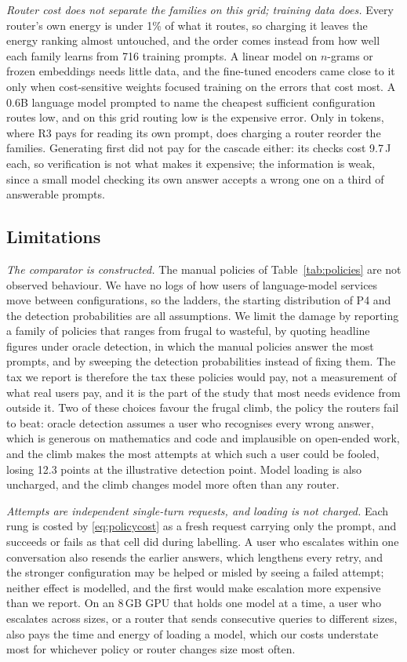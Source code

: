 \documentclass[final,5p,times,twocolumn]{elsarticle}
\theoremstyle{plain}
\begin{document}
\emph{Router cost does not separate the families on this grid; training data
does.} Every router's own energy is under 1\% of what it routes, so charging
it leaves the energy ranking almost untouched, and the order comes instead
from how well each family learns from 716 training prompts. A linear model on
$n$-grams or frozen embeddings needs little data, and the fine-tuned encoders
came close to it only when cost-sensitive weights focused training on the
errors that cost most. A 0.6B language model prompted to name the cheapest
sufficient configuration routes low, and on this grid routing low is the
expensive error. Only in tokens, where R3 pays for reading its own prompt,
does charging a router reorder the families. Generating first did not pay for
the cascade either: its checks cost 9.7\,J each, so verification is not what
makes it expensive; the information is weak, since a small model checking its
own answer accepts a wrong one on a third of answerable prompts.

\subsection{Limitations}
\label{sec:limitations}

\emph{The comparator is constructed.} The manual policies of
Table~\ref{tab:policies} are not observed behaviour. We have no logs of how
users of language-model services move between configurations, so the ladders,
the starting distribution of P4 and the detection probabilities are all
assumptions. We limit the damage by reporting a family of policies that
ranges from frugal to wasteful, by quoting headline figures under oracle
detection, in which the manual policies answer the most prompts, and by
sweeping the detection probabilities instead of fixing them. The tax we
report is therefore the tax these policies would pay, not a measurement of
what real users pay, and it is the part of the study that most needs evidence
from outside it. Two of these choices favour the frugal climb, the policy the
routers fail to beat: oracle detection assumes a user who recognises every
wrong answer, which is generous on mathematics and code and implausible on
open-ended work, and the climb makes the most attempts at which such a user
could be fooled, losing 12.3 points at the illustrative detection point.
Model loading is also uncharged, and the climb changes model more often than
any router.

\emph{Attempts are independent single-turn requests, and loading is not
charged.} Each rung is costed by \eqref{eq:policycost} as a fresh request
carrying only the prompt, and succeeds or fails as that cell did during
labelling. A user who escalates within one conversation also resends the
earlier answers, which lengthens every retry, and the stronger configuration
may be helped or misled by seeing a failed attempt; neither effect is
modelled, and the first would make escalation more expensive than we report.
On an 8\,GB GPU that holds one model at a time, a user who escalates across
sizes, or a router that sends consecutive queries to different sizes, also
pays the time and energy of loading a model, which our costs understate most
for whichever policy or router changes size most often.
\end{document}
